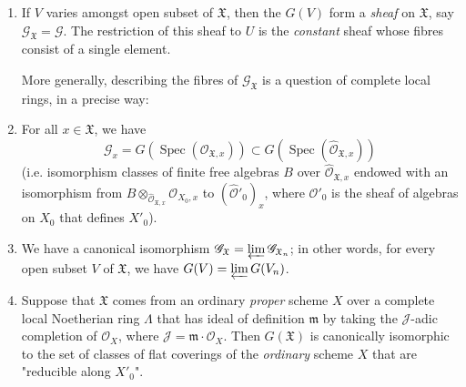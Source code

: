   
 \begin{enumerate}
    
 \item[a.]
      \par{}If \(V\) varies amongst open subset of \(\mathfrak {X}\), then the \(G(V)\) form a \emph{sheaf} on \(\mathfrak {X}\), say \(\mathscr {G}_\mathfrak {X}=\mathscr {G}\).
        The restriction of this sheaf to \(U\) is the \emph{constant} sheaf whose fibres consist of a single element.
      \par{}More generally, describing the fibres of \(\mathscr {G}_\mathfrak {X}\) is a question of complete local rings, in a precise way:
    

      
    
 \item[b.]
      For all \(x\in \mathfrak {X}\), we have
      \[         \mathscr {G}_x = G(\operatorname {Spec}(\mathscr {O}_{\mathfrak {X},x})) \subset  G(\operatorname {Spec}(\widehat {\mathscr {O}}_{\mathfrak {X},x}))       \]
      (i.e. isomorphism classes of finite free algebras \(B\) over \(\widehat {\mathscr {O}}_{\mathfrak {X},x}\) endowed with an isomorphism from \(B\otimes _{\widehat {\mathscr {O}}_{\mathfrak {X},x}}\mathscr {O}_{X_0,x}\) to \((\widehat {\mathscr {O}}'_0)_x\), where \(\mathscr {O}'_0\) is the sheaf of algebras on \(X_0\) that defines \(X'_0\)).
    


    
 \item[c.]
      We have a canonical isomorphism \(\mathscr {G}_\mathfrak {X}=\varprojlim \mathscr {G}_{\mathfrak {X}_n}\); in other words, for every open subset \(V\) of \(\mathfrak {X}\), we have \(G(V)=\varprojlim  G(V_n)\).
    


    
 \item[d.]
      Suppose that \(\mathfrak {X}\) comes from an ordinary \emph{proper} scheme \(X\) over a complete local Noetherian ring \(\Lambda \) that has ideal of definition \(\mathfrak {m}\) by taking the \(\mathscr {J}\)-adic completion of \(\mathscr {O}_X\), where \(\mathscr {J}=\mathfrak {m}\cdot \mathscr {O}_X\).
      Then \(G(\mathfrak {X})\) is canonically isomorphic to the set of classes of flat coverings of the \emph{ordinary} scheme \(X\) that are "reducible along \(X'_0\)".
    

  \end{enumerate}


